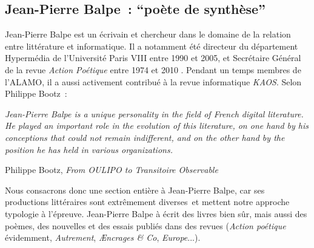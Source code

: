 \documentclass{article}
\newenvironment{citationbox}
{\begin{center}
		\begin{minipage}{.8\textwidth}
		}
		{
		\end{minipage}	
\end{center}
}
\begin{document}
		\subsection{Jean-Pierre Balpe~: ``poète de synthèse''}\label{balpe}
			Jean-Pierre Balpe est un écrivain et chercheur dans le domaine de la relation entre littérature et informatique. Il a notamment été directeur du département Hypermédia de l'Université Paris VIII entre 1990 et 2005, et Secrétaire Général de la revue \textit{Action Poétique} entre 1974 et 2010 \cite{wiki:jp_balpe}. Pendant un temps membres de l'ALAMO, il a aussi activement contribué à la revue informatique \textit{KAOS}. Selon Philippe Bootz~:
			\begin{citationbox}
				\textit{Jean-Pierre Balpe is a unique personality in the field of French digital literature. He played an important role in the evolution of this literature, on one hand by his conceptions that could not remain indifferent, and on the other hand by the position he has held in various organizations.}
				\begin{flushright}
					Philippe Bootz, \textit{From OULIPO to Transitoire Observable} \cite{bootz2012}
				\end{flushright}
			\end{citationbox}
			Nous consacrons donc une section entière à Jean-Pierre Balpe, car ses productions littéraires sont extrêmement diverses et mettent notre approche typologie à l'épreuve. Jean-Pierre Balpe à écrit des livres bien sûr, mais aussi des poèmes, des nouvelles et des essais publiés dans des revues (\textit{Action poétique} évidemment, \textit{Autrement}, \textit{Æncrages \& Co}, \textit{Europe}...).\\
			
\end{document}
